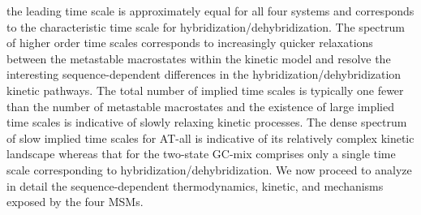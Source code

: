 \documentclass[journal=jpcbfk,manuscript=article]{achemso}
\begin{document}
the leading time scale is approximately equal for all four systems and corresponds to the characteristic time scale for hybridization/dehybridization. The spectrum of higher order time scales corresponds to increasingly quicker relaxations between the metastable macrostates within the kinetic model and resolve the interesting sequence-dependent differences in the hybridization/dehybridization kinetic pathways. The total number of implied time scales is typically one fewer than the number of metastable macrostates and the existence of large implied time scales is indicative of slowly relaxing kinetic processes. The dense spectrum of slow implied time scales for AT-all is indicative of its relatively complex kinetic landscape whereas that for the two-state GC-mix comprises only a single time scale corresponding to hybridization/dehybridization. We now proceed to analyze in detail the sequence-dependent thermodynamics, kinetic, and mechanisms exposed by the four MSMs.




\end{document}
